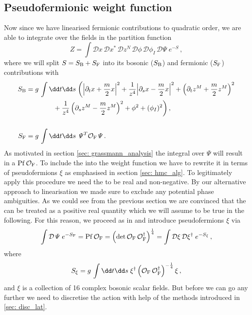 \subsection{Pseudofermionic weight function}
Now since we have linearised fermionic contributions to quadratic order, we are able to integrate over the  fields in the partition function
%
%
\begin{equation}
Z = \int \mathcal{D}x\,\mathcal{D}x^{*}\,\mathcal{D}z^{N}\,\mathcal{D}\phi\,\mathcal{D}\phi_{I}\,\mathcal{D}\mathit{\Psi}\; e^{-S}\,,
\label{eq: Z_string2}
\end{equation}
%
%
where we will split $S = S_{\rm B} + S_{\rm F}$ into its bosonic ($S_{\rm B}$) and fermionic ($S_{\rm F}$) contributions with
%
%
\begin{align}
S_{\rm B} &= g\,\int \dd t\dd s\; \bigg({\left\vert \partial_t {x} + {\frac{m}{2}}{x} \right\vert}^2 + \frac{1}{{ z}^4}{\left\vert \partial_s {x} -\frac{m}{2}{x} \right\vert}^2 + \left(\partial_t {z}^M + \frac{m}{2}{z}^M \right)^2 \notag \\
&\qquad\qquad+ \frac{1}{{ z}^4} \left(\partial_s {z}^M -\frac{m}{2}{z}^M\right)^2 + \phi^2 + (\phi_{I})^{2} \bigg)\,, \label{eq: bos_act} \\[0.5cm]
S_{\rm F} &=  g\,\int \dd t\dd s\; \mathit{\Psi}^T \mathcal{O}_{\rm F} \mathit{\Psi} \,. \notag
\end{align}
%
%
As motivated in section \ref{sec: grassmann_analysis} the  integral over $\mathit{\Psi}$ will result in a  ${\rm Pf}\,\mathcal{O}_{\rm F}$. To include the  into the weight function we have to rewrite it in terms of pseudofermions $\xi$ as emphasised in section \ref{sec: hmc_alg}. To legitimately apply this procedure we need the  to be real and non-negative. By our alternative approach to linearisation we made sure to exclude any potential phase ambiguities. As we could see from the previous section we are convinced that the  can be treated as a positive real quantity which we will assume to be true in the following. For this reason, we proceed as in \cite{Roiban} and introduce pseudofermions $\xi$ via
%
%
\begin{equation}
\int \mathcal{D}\mathit{\Psi}\; e^{-S_{\rm F}} = {\rm Pf}\,\mathcal{O}_{\rm F} =\left( \det \mathcal{O}_{\rm F}\,\mathcal{O}_{\rm F}^{\dagger} \right)^{\frac{1}{4}} = \int \mathcal{D}\xi\,\mathcal{D}\xi^{\dagger}\; e^{-S_{\xi}}\,,
\end{equation}
%
%
where
%
%
\begin{equation}
S_{\xi} = g\,\int \dd t\dd s \; \xi^{\dagger} \left(\mathcal{O}_{\rm F}\,\mathcal{O}_{\rm F}^{\dagger} \right)^{-\frac{1}{4}} \xi \,,
\label{eq: S_xi}
\end{equation}
and $\xi$ is a collection of 16 complex bosonic scalar fields. But before we can go any further we need to discretise the action with help of the methods introduced in \autoref{sec: disc_lat}.
%
%
%
%
%
%
%
%
%
%
